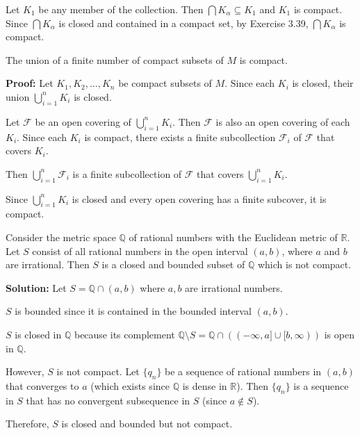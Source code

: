 Let $K_1$ be any member of the collection. Then $\bigcap K_\alpha \subseteq K_1$ and $K_1$ is compact. Since $\bigcap K_\alpha$ is closed and contained in a compact set, by Exercise 3.39, $\bigcap K_\alpha$ is compact.

\begin{problembox}
The union of a finite number of compact subsets of \( M \) is compact.
\end{problembox}

\textbf{Proof:} Let $K_1, K_2, \ldots, K_n$ be compact subsets of $M$. Since each $K_i$ is closed, their union $\bigcup_{i=1}^n K_i$ is closed.

Let $\mathcal{F}$ be an open covering of $\bigcup_{i=1}^n K_i$. Then $\mathcal{F}$ is also an open covering of each $K_i$. Since each $K_i$ is compact, there exists a finite subcollection $\mathcal{F}_i$ of $\mathcal{F}$ that covers $K_i$.

Then $\bigcup_{i=1}^n \mathcal{F}_i$ is a finite subcollection of $\mathcal{F}$ that covers $\bigcup_{i=1}^n K_i$.

Since $\bigcup_{i=1}^n K_i$ is closed and every open covering has a finite subcover, it is compact.

\begin{problembox}
Consider the metric space \( \mathbb{Q} \) of rational numbers with the Euclidean metric of \( \mathbb{R} \). Let \( S \) consist of all rational numbers in the open interval \((a, b)\), where \( a \) and \( b \) are irrational. Then \( S \) is a closed and bounded subset of \( \mathbb{Q} \) which is not compact.
\end{problembox}

\textbf{Solution:} Let $S = \mathbb{Q} \cap (a,b)$ where $a, b$ are irrational numbers.

$S$ is bounded since it is contained in the bounded interval $(a,b)$.

$S$ is closed in $\mathbb{Q}$ because its complement $\mathbb{Q} \setminus S = \mathbb{Q} \cap ((-\infty,a] \cup [b,\infty))$ is open in $\mathbb{Q}$.

However, $S$ is not compact. Let $\{q_n\}$ be a sequence of rational numbers in $(a,b)$ that converges to $a$ (which exists since $\mathbb{Q}$ is dense in $\mathbb{R}$). Then $\{q_n\}$ is a sequence in $S$ that has no convergent subsequence in $S$ (since $a \notin S$).

Therefore, $S$ is closed and bounded but not compact.

